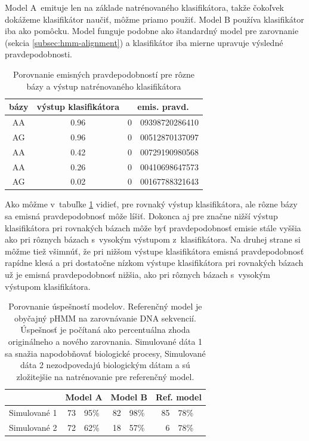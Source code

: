 Model A~emituje len na základe natrénovaného klasifikátora, takže čokoľvek dokážeme klasifikátor naučiť, môžme priamo použiť. Model B používa klasifikátor iba ako pomôcku. Model funguje podobne ako štandardný model pre zarovnanie (sekcia \ref{subsec:hmm-alignment}) a klasifikátor iba mierne upravuje výsledné pravdepodobnosti.

\begin{table}
\centering
\begin{tabular}{cc|r@{,}l}
bázy & výstup klasifikátora & \multicolumn{2}{c}{emis. pravd.}\\
\hline
AA & 0.96 & 0 & 09398720286410\\
AG & 0.96 & 0 & 00512870137097\\
AA & 0.42 & 0 & 00729190980568\\
AA & 0.26 & 0 & 00410698647573\\
AG & 0.02 & 0 & 00167788321643\\
\end{tabular}
\caption[Porovnanie emisných pravdepodobností]{Porovnanie emisných pravdepodobností pre rôzne bázy a výstup natrénovaného klasifikátora}
\label{tab:emission-prob}
\end{table}

Ako môžme v~tabuľke \ref{tab:emission-prob} vidieť, pre rovnaký výstup klasifikátora, ale rôzne bázy sa emisná pravdepodobnosť môže líšiť. Dokonca aj pre značne nižší výstup klasifikátora pri rovnakých bázach môže byť pravdepodobnosť emisie stále vyššia ako pri rôznych bázach s~vysokým výstupom z~klasifikátora. Na druhej strane si môžme tiež všimnúť, že pri nižšom výstupe klasifikátora emisná pravdepodobnosť rapídne klesá a pri dostatočne nízkom výstupe klasifikátora pri rovnakých bázach už je emisná pravdepodobnosť nižšia, ako pri rôznych bázach s~vysokým výstupom klasifikátora.

\begin{table}[htp]
\centering
\begin{tabular}{c|r@{,}lr@{,}lr@{,}l}
& \multicolumn{2}{c}{Model A}  & \multicolumn{2}{c}{Model B} & \multicolumn{2}{c}{Ref. model}\\
\hline
Simulované 1 & 73 & 95\% & 82 & 98\% & 85 & 78\%\\
Simulované 2 & 72 & 62\% & 18 & 57\% & 6 & 78\% \\
\end{tabular}
\caption[Porovnanie úspešností modelov]{Porovnanie úspešností modelov. Referenčný model je obyčajný pHMM na zarovnávanie DNA sekvencií. Úspešnosť je počítaná ako percentuálna zhoda originálneho a nového zarovnania. Simulované dáta 1 sa snažia napodobňovať biologické procesy, Simulované dáta 2 nezodpovedajú biologickým dátam a sú zložitejšie na natrénovanie pre referenčný model.}
\label{tab:success-compare}
\end{table}

